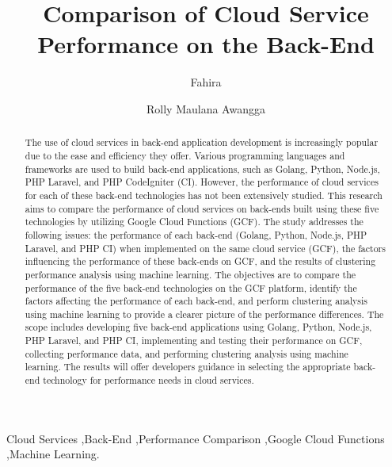 \documentclass[final,3p,times,twocolumn]{elsarticle}
\begin{document}
\begin{frontmatter}

\title{Comparison of Cloud Service Performance on the Back-End}
\author{Fahira}

\author{Rolly Maulana Awangga}


\address{Universitas Logistik dan Bisnis Internasional}




\begin{abstract}
The use of cloud services in back-end application development is increasingly popular due to the ease and efficiency they offer. Various programming languages and frameworks are used to build back-end applications, such as Golang, Python, Node.js, PHP Laravel, and PHP CodeIgniter (CI). However, the performance of cloud services for each of these back-end technologies has not been extensively studied. This research aims to compare the performance of cloud services on back-ends built using these five technologies by utilizing Google Cloud Functions (GCF). The study addresses the following issues: the performance of each back-end (Golang, Python, Node.js, PHP Laravel, and PHP CI) when implemented on the same cloud service (GCF), the factors influencing the performance of these back-ends on GCF, and the results of clustering performance analysis using machine learning. The objectives are to compare the performance of the five back-end technologies on the GCF platform, identify the factors affecting the performance of each back-end, and perform clustering analysis using machine learning to provide a clearer picture of the performance differences. The scope includes developing five back-end applications using Golang, Python, Node.js, PHP Laravel, and PHP CI, implementing and testing their performance on GCF, collecting performance data, and performing clustering analysis using machine learning. The results will offer developers guidance in selecting the appropriate back-end technology for performance needs in cloud services.
\end{abstract}

\begin{keyword}
Cloud Services \sep Back-End \sep Performance Comparison \sep Google Cloud Functions \sep Machine Learning.
\end{keyword}

\end{frontmatter}
\end{document}
